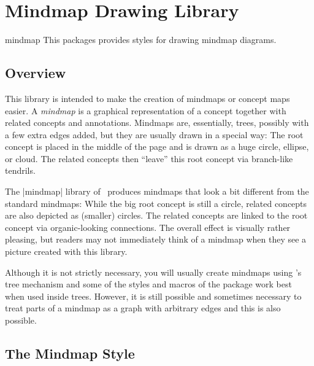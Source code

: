 %
%
%


\section[library-mindmaps]{Mindmap Drawing Library}

\begin{tikzlibrary}{mindmap}
    This packages provides styles for drawing mindmap diagrams.
\end{tikzlibrary}


\subsection{Overview}

This library is intended to make the creation of mindmaps or concept maps
easier. A \emph{mindmap} is a graphical representation of a concept together
with related concepts and annotations. Mindmaps are, essentially, trees,
possibly with a few extra edges added, but they are usually drawn in a special
way: The root concept is placed in the middle of the page and is drawn as a
huge circle, ellipse, or cloud. The related concepts then ``leave'' this root
concept via branch-like tendrils.

The |mindmap| library of \tikzname\ produces mindmaps that look a bit different
from the standard mindmaps: While the big root concept is still a circle,
related concepts are also depicted as (smaller) circles. The related concepts
are linked to the root concept via organic-looking connections. The overall
effect is visually rather pleasing, but readers may not immediately think of a
mindmap when they see a picture created with this library.

Although it is not strictly necessary, you will usually create mindmaps using
\tikzname's tree mechanism and some of the styles and macros of the package
work best when used inside trees. However, it is still possible and sometimes
necessary to treat parts of a mindmap as a graph with arbitrary edges and this
is also possible.


\subsection{The Mindmap Style}

